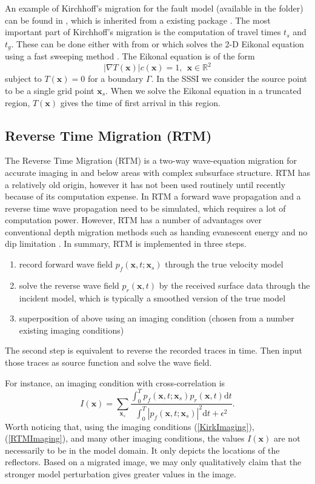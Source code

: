 \documentclass[11pt]{article}
\newcommand{\real}{\mathbb{R}}
\newcommand{\bx}{\boldsymbol{x}}
\theoremstyle{plain}
\theoremstyle{definition}
\theoremstyle{remark}
\numberwithin{equation}{section}
\begin{document}
An example of Kirchhoff's migration for the fault model (available in the  folder) can 
be found in , which is 
inherited from a existing package \cite{Koz2011}.
The most important part of Kirchhoff's migration is the computation of travel times $t_s$ and $t_g$.   
These can be done either with  from \cite{Koz2011} or
 which solves the 2-D Eikonal equation using a fast sweeping method \cite{Zha2004}.
The Eikonal equation is of the form
\begin{equation}
|\nabla T(\bx)| c(\bx)= 1, ~~\bx\in \real^2
\end{equation}
subject to $T(\bx) = 0$ for a boundary $\Gamma$. In the SSSI we consider the source point to be a single 
grid point $\bx_s$. When we solve the Eikonal equation in a truncated region, $T(\bx)$ gives the time of 
first arrival in this region. 

\subsection{Reverse Time Migration (RTM)}
The Reverse Time Migration (RTM) is a two-way wave-equation migration for accurate imaging in and below areas with complex subsurface 
structure. RTM has a relatively old origin, however it has not been used routinely until recently because of its
computation expense. In RTM a forward wave propagation and a reverse time wave propagation need to be 
simulated, which requires a lot of computation power. However, RTM has a number of advantages over conventional depth migration methods such as 
handing evanescent energy and no dip limitation \cite{Mcm1983, BayKosAO1983}. In summary, RTM is implemented in three steps. 
\begin{enumerate}
\item record forward wave field $p_f(\bx, t; \bx_s)$ through the true velocity model
\item solve the reverse wave field $p_r(\bx, t)$ by the received surface data through the incident model, which is typically a smoothed version of the true model
\item superposition of above using an imaging condition (chosen from a number existing imaging conditions)
\end{enumerate}
The second step is equivalent to reverse the recorded traces in time. Then input those traces as source function and solve the wave field. 

For instance, an imaging condition with cross-correlation is 
\begin{equation}\label{RTMImaging}
I(\bx) = \sum_{\bx_s} \frac{\int_0^T p_f(\bx, t; \bx_s)p_r(\bx, t)\mathrm{d}t}{\int_0^T |p_f(\bx, t; \bx_s)|^2\mathrm{d}t + \epsilon^2}.
\end{equation}
Worth noticing that, using the imaging conditions (\ref{KirkImaging}), (\ref{RTMImaging}), and many other imaging conditions, the values $I(\bx)$ are not necessarily to be in the model domain. It only depicts the locations of the reflectors. Based on a migrated image, we may only qualitatively claim that the stronger model perturbation gives greater values in the image. 
\end{document}
